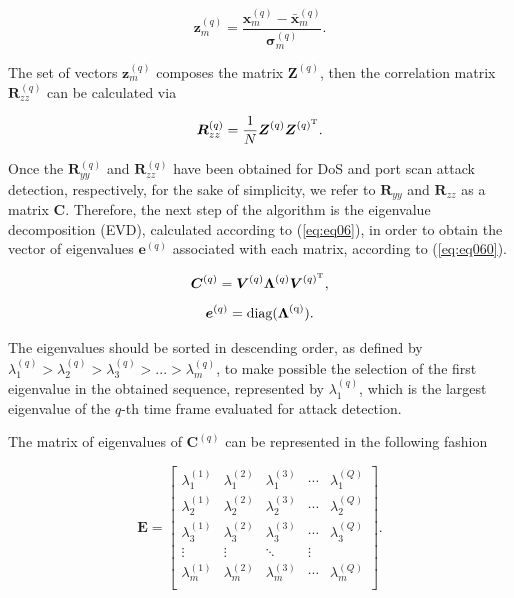 \documentclass{bmcart}
\begin{document}
\begin{equation}\label{eq:eq04}
\boldsymbol{z}_{m}^{(q)} = \frac{\boldsymbol{x}_{m}^{(q)} - \bar{\boldsymbol{x}}_{m}^{(q)}}{\boldsymbol{\sigma}_{m}^{(q)}}.
\end{equation}

The set of vectors $\boldsymbol{z}_{m}^{(q)}$ composes the matrix $\boldsymbol{Z}^{(q)}$, then the correlation matrix $\boldsymbol{R}_{zz}^{(q)}$ can be calculated via 

\begin{equation}\label{eq:eq05}
\boldsymbol{R}_{zz}^{(q)} = \frac{1}{N}\boldsymbol{Z}^{(q)}\boldsymbol{Z}^{(q)^{\rm T}}.
\end{equation}

Once the $\boldsymbol{R}_{yy}^{(q)}$ and $\boldsymbol{R}_{zz}^{(q)}$ have been obtained for DoS and port scan attack detection, respectively, for the sake of simplicity, we refer to $\boldsymbol{R}_{yy}$ and $\boldsymbol{R}_{zz}$ as a matrix $\boldsymbol{C}$. Therefore, the next step of the algorithm is the eigenvalue decomposition (EVD), calculated according to (\ref{eq:eq06}), in order to obtain the vector of eigenvalues $\boldsymbol{e}^{(q)}$ associated with each matrix, according to (\ref{eq:eq060}).

\begin{equation}\label{eq:eq06}
\boldsymbol{C}^{(q)} = \boldsymbol{V}^{(q)}\boldsymbol{\Lambda}^{(q)}\boldsymbol{V}^{(q)^{\rm T}},
\end{equation}
\begin{equation}\label{eq:eq060}
\boldsymbol{e}^{(q)} = \rm diag(\boldsymbol{\Lambda}^{(q)}).
\end{equation}

The eigenvalues should be sorted in descending order, as defined by $\lambda_{1}^{(q)} > \lambda_{2}^{(q)} > \lambda_{3}^{(q)} > ... > \lambda_{m}^{(q)}$, to make possible the selection of the first eigenvalue in the obtained sequence, represented by $\lambda_{1}^{(q)}$, which is the largest eigenvalue of the $q$-th time frame evaluated for attack detection.

The matrix of eigenvalues of $\boldsymbol{C}^{(q)}$ can be represented in the following fashion 

\begin{equation}\label{eq:eq07}
\boldsymbol{E} =
\begin{bmatrix}
  \lambda_1^{(1)} & \lambda_1^{(2)} & \lambda_1^{(3)} & \cdots & \lambda_1^{(Q)} \\
  \lambda_2^{(1)} & \lambda_2^{(2)} & \lambda_2^{(3)} & \cdots & \lambda_2^{(Q)} \\
  \lambda_3^{(1)} & \lambda_3^{(2)} & \lambda_3^{(3)} & \cdots & \lambda_3^{(Q)} \\
  \vdots & \vdots & \ddots & \vdots  \\
  \lambda_m^{(1)} & \lambda_m^{(2)} & \lambda_m^{(3)} & \cdots & \lambda_m^{(Q)} \\
\end{bmatrix}.
\end{equation}
\end{document}
